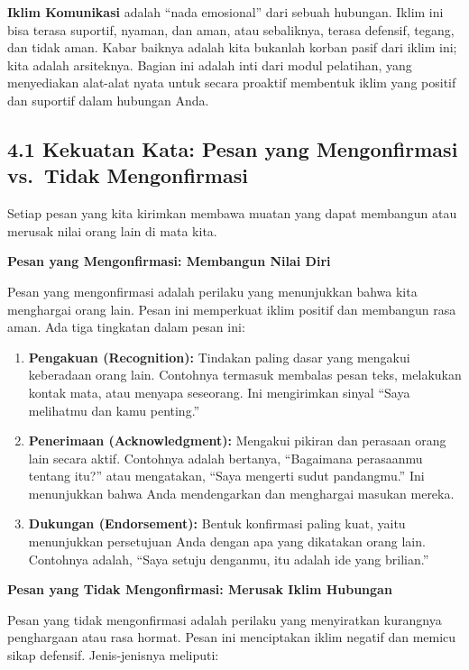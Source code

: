 \documentclass[
  letterpaper,
  DIV=11,
  numbers=noendperiod]{scrreprt}
\providecommand{\tightlist}{%
  \setlength{\itemsep}{0pt}\setlength{\parskip}{0pt}}
\begin{document}
\textbf{Iklim Komunikasi} adalah ``nada emosional'' dari sebuah
hubungan. Iklim ini bisa terasa suportif, nyaman, dan aman, atau
sebaliknya, terasa defensif, tegang, dan tidak aman. Kabar baiknya
adalah kita bukanlah korban pasif dari iklim ini; kita adalah
arsiteknya. Bagian ini adalah inti dari modul pelatihan, yang
menyediakan alat-alat nyata untuk secara proaktif membentuk iklim yang
positif dan suportif dalam hubungan Anda.

\subsection{\texorpdfstring{\textbf{4.1 Kekuatan Kata: Pesan yang
Mengonfirmasi vs.~Tidak
Mengonfirmasi}}{4.1 Kekuatan Kata: Pesan yang Mengonfirmasi vs.~Tidak Mengonfirmasi}}\label{kekuatan-kata-pesan-yang-mengonfirmasi-vs.-tidak-mengonfirmasi}

Setiap pesan yang kita kirimkan membawa muatan yang dapat membangun atau
merusak nilai orang lain di mata kita.

\textbf{Pesan yang Mengonfirmasi: Membangun Nilai Diri}

Pesan yang mengonfirmasi adalah perilaku yang menunjukkan bahwa kita
menghargai orang lain. Pesan ini memperkuat iklim positif dan membangun
rasa aman. Ada tiga tingkatan dalam pesan ini:

\begin{enumerate}
\def\labelenumi{\arabic{enumi}.}
\tightlist
\item
  \textbf{Pengakuan (Recognition):} Tindakan paling dasar yang mengakui
  keberadaan orang lain. Contohnya termasuk membalas pesan teks,
  melakukan kontak mata, atau menyapa seseorang. Ini mengirimkan sinyal
  ``Saya melihatmu dan kamu penting.''
\item
  \textbf{Penerimaan (Acknowledgment):} Mengakui pikiran dan perasaan
  orang lain secara aktif. Contohnya adalah bertanya, ``Bagaimana
  perasaanmu tentang itu?'' atau mengatakan, ``Saya mengerti sudut
  pandangmu.'' Ini menunjukkan bahwa Anda mendengarkan dan menghargai
  masukan mereka.
\item
  \textbf{Dukungan (Endorsement):} Bentuk konfirmasi paling kuat, yaitu
  menunjukkan persetujuan Anda dengan apa yang dikatakan orang lain.
  Contohnya adalah, ``Saya setuju denganmu, itu adalah ide yang
  brilian.''
\end{enumerate}

\textbf{Pesan yang Tidak Mengonfirmasi: Merusak Iklim Hubungan}

Pesan yang tidak mengonfirmasi adalah perilaku yang menyiratkan
kurangnya penghargaan atau rasa hormat. Pesan ini menciptakan iklim
negatif dan memicu sikap defensif. Jenis-jenisnya meliputi:
\end{document}
